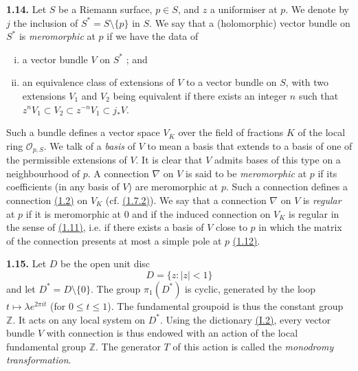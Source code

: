 \documentclass{report}
\newenvironment{rmenv}[1]
  {\phantomsection\par\medskip\noindent\textbf{#1.}\rmfamily}
  {\medskip}
\renewcommand{\cal}[1]{{\mathcal{#1}}}
\newcommand{\ZZ}{\mathbb{Z}}
\renewcommand{\leq}{\leqslant}
\newcommand{\oldpage}[1]{\marginpar{\footnotesize$\Big\vert$ \textit{p.~#1}}}
\begin{document}
\begin{rmenv}{1.14}
\label{II.1.14}
  Let $S$ be a Riemann surface, $p\in S$, and $z$ a uniformiser at $p$.
  We denote by $j$ the inclusion of $S^*=S\setminus\{p\}$ in $S$.
  We say that a (holomorphic) vector bundle on $S^*$ is \emph{meromorphic} at $p$ if we have the data of
  \begin{enumerate}[(i)]
    \item a vector bundle $V$ on $S^*$ ; and
    \item an equivalence class of extensions of $V$ to a vector bundle on $S$, with two extensions $V_1$ and $V_2$ being equivalent if there exists an integer $n$ such that $z^nV_1\subset V_2\subset z^{-n}V_1\subset j_*V$.
  \end{enumerate}

  Such a bundle defines a vector space $V_K$ over the field of fractions $K$ of the local ring $\cal{O}_{p,S}$.
  We talk of a \emph{basis} of $V$ to mean a basis that extends to a basis of one of the permissible extensions of $V$.
  It is clear that $V$ admits bases of this type on a neighbourhood of $p$.
  A connection $\nabla$ on $V$ is said to be \emph{meromorphic} at $p$ if its coefficients (in any basis of $V$) are meromorphic at $p$.
  Such a connection defines a connection \hyperref[II.1.2]{(1.2)} on $V_K$ (cf. \hyperref[II.1.7.2]{(1.7.2)}).
  We say that a connection $\nabla$ on $V$ is \emph{regular} at $p$ if it is meromorphic at $0$ and if the induced connection on $V_K$ is regular in the sense of \hyperref[II.1.11]{(1.11)}, i.e. if there exists a basis of $V$ close to $p$ in which the matrix of the connection presents at most a simple pole at $p$ \hyperref[II.1.12]{(1.12)}.
\end{rmenv}

\begin{rmenv}{1.15}
\label{II.1.15}
  Let $D$ be the open unit disc
  \[
    D = \{z : |z|<1\}
  \]
  and let $D^*=D\setminus\{0\}$.
  The group $\pi_1(D^*)$ is cyclic, generated by the loop
\oldpage{53}
  $t\mapsto\lambda e^{2\pi it}$ (for $0\leq t\leq1$).
  The fundamental groupoid is thus the constant group $\ZZ$.
  It acts on any local system on $D^*$.
  Using the dictionary \hyperref[I.2]{(I.2)}, every vector bundle $V$ with connection is thus endowed with an action of the local fundamental group $\ZZ$.
  The generator $T$ of this action is called the \emph{monodromy transformation}.
\end{rmenv}
\end{document}
